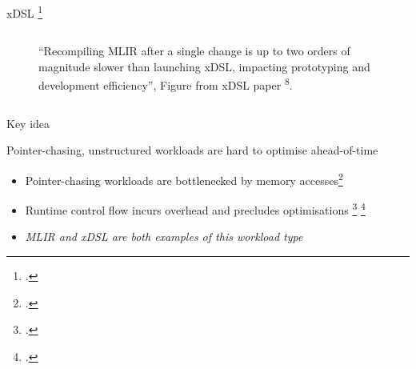 \documentclass[10pt,aspectratio=169]{beamer}
\renewcommand{\cite}{\footcite}
\begin{document}
\begin{frame}{xDSL \cite{fehrXDSLSidekickCompilation2025}}
\begin{columns}[T,onlytextwidth]
\begin{figure}[H]
                \caption{``Recompiling MLIR after a single change is up
to two orders of magnitude slower than launching xDSL,
impacting prototyping and development efficiency'', Figure from xDSL paper \textsuperscript{8}.}
                \label{fig:compile_times}
            \end{figure}
    \end{columns}
\end{frame}



\begin{frame}{Key idea}
    \begin{center}
        \huge Pointer-chasing, unstructured workloads are hard to optimise ahead-of-time
    \end{center}
    \vspace{1em}

    \begin{itemize}
        \item Pointer-chasing workloads are bottlenecked by memory accesses\cite{wangEvaluatingSynchronizationOverhead2025}
        \item Runtime control flow incurs overhead and precludes optimisations \cite{driesenDirectCostVirtual1996}  \cite{emerybergerPythonPerformanceMatters2022}
        \item \textit{MLIR and xDSL are both examples of this workload type}
    \end{itemize}
\end{frame}
\end{document}
